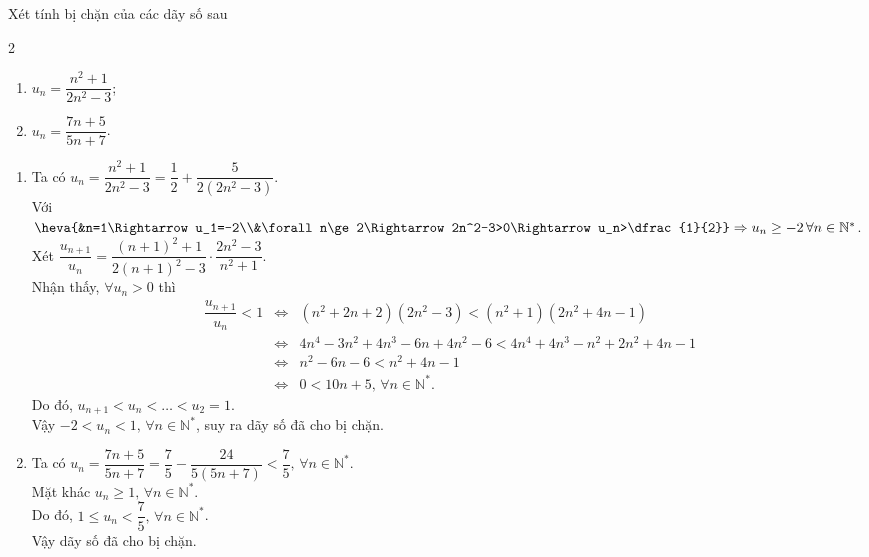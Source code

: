 \begin{vd}%
Xét tính bị chặn của các dãy số sau
\begin{multicols}{2}
	\begin{enumerate}
		\item $u_n=\dfrac{n^2+1}{2n^2-3}$;
		\item $u_n=\dfrac{7n+5}{5n+7}$.
	\end{enumerate}
\end{multicols}
	\loigiai 
	{
		\begin{enumerate}
			\item Ta có $u_n=\dfrac{n^2+1}{2n^2-3}=\dfrac{1}{2}+\dfrac{5}{2(2n^2-3)}$.\\
			Với $\heva{&n=1\Rightarrow u_1=-2\\&\forall n\ge 2\Rightarrow 2n^2-3>0\Rightarrow u_n>\dfrac{1}{2}}\Rightarrow u_n\ge -2\, \forall n\in\mathbb{N}^*$.\\
			Xét $\dfrac{u_{n+1}}{u_n}=\dfrac{(n+1)^2+1}{2(n+1)^2-3}\cdot\dfrac{2n^2-3}{n^2+1}$.\\
			Nhận thấy, $\forall u_n>0$ thì
			\allowdisplaybreaks
			\begin{eqnarray*}
				\dfrac{u_{n+1}}{u_n}<1&\Leftrightarrow&(n^2+2n+2)(2n^2-3)<(n^2+1)(2n^2+4n-1)\\
				&\Leftrightarrow& 4n^4-3n^2+4n^3-6n+4n^2-6<4n^4+4n^3-n^2+2n^2+4n-1\\
				&\Leftrightarrow& n^2-6n-6<n^2+4n-1\\
				&\Leftrightarrow& 0<10n+5,\,\forall n\in\mathbb{N}^*.
			\end{eqnarray*}
		Do đó, $u_{n+1}<u_n<\ldots<u_2=1$.\\
		Vậy $-2<u_n<1,\,\forall n\in\mathbb{N}^*$, suy ra dãy số đã cho bị chặn.
			\item Ta có $u_n=\dfrac{7n+5}{5n+7}=\dfrac{7}{5}-\dfrac{24}{5(5n+7)}<\dfrac{7}{5},\,\forall n\in\mathbb{N}^*$.\\
			Mặt khác $u_n\ge 1,\,\forall n\in\mathbb{N}^*$.\\
			Do đó, $1\le u_n<\dfrac{7}{5},\,\forall n\in\mathbb{N}^*$.\\ Vậy dãy số đã cho bị chặn.
		\end{enumerate}
	}
\end{vd}

